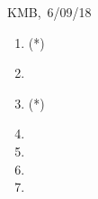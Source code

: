 \documentclass[10pt]{article}
\begin{document}
\begin{flushright} KMB,\ 6/09/18\end{flushright}


\begin{enumerate}
\item(*)
\item
\item(*)
\item
\item
\item
\item
\end{enumerate}
\end{document}
